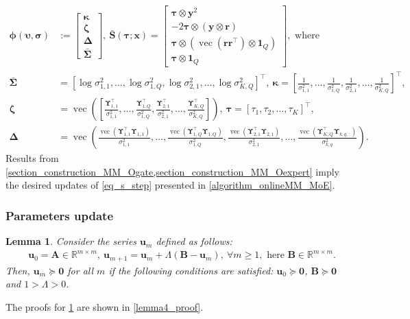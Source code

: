 \documentclass{article}
\newcommand{\zero}{\ensuremath{\mathbf{0}}}
\DeclareMathOperator*{\vect}{vec} %
\def\phib        {{\sbmm{\phi}}\XS}        \def\Phib       {{\sbmm{\Phi}}\XS}
\def\XS{\xspace}
\def\sbmm#1{\ensuremath{\boldsymbol{#1}}}
\newtheorem{lemma}{Lemma}
\def\bars{\bar{\vS}}
\def\vtau{{\bm{\tau}}}
\def\vsigma{{\bm{\sigma}}}
\def\vkappa{{\bm{\kappa}}}
\def\vzeta{{\bm{\zeta}}}
\def\vSigma{{\bm{\Sigma}}}
\def\vupsilon{{\bm{\upsilon}}}
\def\vr{{\bm{r}}}
\def\vS{{\bm{S}}}
\def\vu{{\bm{u}}}
\def\vx{{\bm{x}}}
\def\vy{{\bm{y}}}
\def\mA{{\bm{A}}}
\def\mDelta{{\bm{\Delta}}}
\def\mB{{\bm{B}}}
\def\mUpsilon{{\bm{\Upsilon}}}
\def\sR{{\mathbb{R}}}
\begin{document}
\begin{align*}
    \phib(\vupsilon,\vsigma)&:=
    \begin{bmatrix}
      \vkappa\\
      \vzeta \\
      \mDelta\\
      \bar{\vSigma}
    \end{bmatrix},~ 
    \bars(\vtau;\vx)=
    \begin{bmatrix}
      \vtau\otimes \vy^{2} \\
      -2\vtau\otimes(\vy\otimes\vr) \\      \vtau\otimes\left(\vect\left(\vr\vr^{\top}\right)\otimes \mathbf{1}_Q\right)\\
      \vtau\otimes \mathbf{1}_Q
    \end{bmatrix}, \text{ where}\\
    \bar{\vSigma}&=[\log\sigma_{1,1}^{2},\dots, \log\sigma_{1,Q}^2, \log\sigma_{2,1}^{2},\dots,\log\sigma_{K,Q}^{2}]^{\top},~\vkappa=\left[\frac{1}{\sigma_{1,1}^{2}},\dots,\frac{1}{\sigma_{1,Q}^2},\frac{1}{\sigma_{2,1}^{2}},\dots,\frac{1}{\sigma_{K,Q}^{2}}\right]^{\top},\\
    \vzeta&=\vect\left(\left[\frac{\mUpsilon_{1,1}^{\top}}{\sigma_{1,1}^{2}},\dots,\frac{\mUpsilon_{1,Q}^{\top}}{\sigma_{1,Q}^{2}},\frac{\mUpsilon_{2,1}^{\top}}{\sigma_{2,1}^{2}},\dots,\frac{\mUpsilon_{K,Q}^{\top}}{\sigma_{K,Q}^{2}}\right]\right),~
    \vtau=[\tau_{1},\tau_{2},\dots,\tau_{K}]^{\top},\\
    \mDelta&=\vect\left(\frac{\vect(\mUpsilon_{1,1}^{\top}\mUpsilon_{1,1})}{\sigma_{1,1}^{2}},\dots,\frac{\vect(\mUpsilon_{1,Q}^{\top}\mUpsilon_{1,Q})}{\sigma_{1,Q}^{2}},\frac{\vect(\mUpsilon_{2,1}^{\top}\mUpsilon_{2,1})}{\sigma_{2,1}^{2}},\dots,\frac{\vect(\mUpsilon_{K,Q}^{\top}\mUpsilon_{k,q,:})}{\sigma_{k,q}^2}\right).
\end{align*}
Results from \cref{section_construction_MM_Ogate,section_construction_MM_Oexpert} imply the desired updates of \cref{eq_s_step} presented in \cref{algorithm_onlineMM_MoE}.
\subsubsection{Parameters update}\label{param update}
\begin{lemma} \label{lemma_nonegative_serie}
    Consider the series $\vu_m$ defined as follows:
    \begin{align*}
        &\vu_0=\mA \in \sR^{m \times m},~\vu_{m+1}=\vu_m+\Lambda(\mB-\vu_m),~ \forall m \geq 1, \text{ here } \mB\in \sR^{m\times m}.
    \end{align*}
    Then, $\vu_m \succeq \zero$ for all $m$ if the following conditions are satisfied: $\vu_0\succeq \zero$, $\mB\succeq \zero$ and $1 >\Lambda > 0$.
\end{lemma}
\par The proofs for \cref{lemma_nonegative_serie} are shown in \cref{lemma4_proof}.
\end{document}
